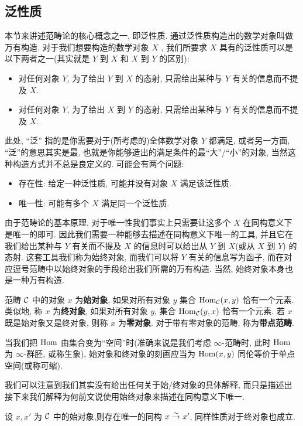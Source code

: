 \subsection{泛性质}
本节来讲述范畴论的核心概念之一, 即泛性质. 通过泛性质构造出的数学对象叫做万有构造. 对于我们想要构造的数学对象 $X$ , 我们所要求 $X$ 具有的泛性质可以是以下两者之一(其实就是 $Y$ 到 $X$ 和 $X$ 到 $Y$ 的区别):
\begin{itemize}
    \item 对任何对象 $Y$, 为了给出 $Y$ 到 $X$ 的态射, 只需给出某种与 $Y$ 有关的信息而不提及 $X$.
    \item 对任何对象 $Y$, 为了给出 $X$ 到 $Y$ 的态射, 只需给出某种与 $Y$ 有关的信息而不提及 $X$.
\end{itemize}
此处, ``泛'' 指的是你需要对于(所考虑的)全体数学对象 $Y$ 都满足, 或者另一方面, ``泛''的意思其实是最, 也就是你能够造出的满足条件的最``大''/``小''的对象, 当然这种构造方式并不总是良定义的. 可能会有两个问题:
\begin{itemize}
    \item 存在性: 给定一种泛性质, 可能并没有对象 $X$ 满足该泛性质.
    \item 唯一性: 可能有多个 $X$ 满足同一个泛性质.
\end{itemize}
由于范畴论的基本原理, 对于唯一性我们事实上只需要让这多个 $X$ 在同构意义下是唯一的即可. 因此我们需要一种能够去描述在同构意义下唯一的工具, 并且它在我们给出某种与 $Y$ 有关而不提及 $X$ 的信息时可以给出从 $Y$ 到 $X$(或从 $X$ 到 $Y$) 的态射.
这套工具我们称为始终对象, 而我们可以将 $Y$ 有关的信息写为函子, 而在对应逗号范畴中以始终对象的手段给出我们所需的万有构造. 当然, 始终对象本身也是一种万有构造.
\begin{definition}
    范畴 $\cal{C}$ 中的对象 $x$ 为\textbf{始对象}, 如果对所有对象 $y$ 集合 $\operatorname{Hom}_{\cal{C}}(x,y)$ 恰有一个元素. 类似地, 称 $x$ 为\textbf{终对象}, 如果对所有对象 $y$, 集合 $\operatorname{Hom}_{\cal{C}}(y,x)$ 恰有一个元素. 若 $x$ 既是始对象又是终对象, 则称 $x$ 为\textbf{零对象}. 对于带有零对象的范畴, 称为\textbf{带点范畴}.
\end{definition}
\begin{remark}
    当我们把 $\operatorname{Hom}$ 由集合变为``空间''时(准确来说是我们考虑 $\infty$-范畴时, 此时 $\operatorname{Hom}$ 为 $\infty$-群胚, 或称生象), 始对象和终对象的刻画应当为 $\operatorname{Hom}(x,y)$ 同伦等价于单点空间(或称可缩).
\end{remark}
我们可以注意到我们其实没有给出任何关于始/终对象的具体解释, 而只是描述出接下来我们解释为何前文说使用始终对象来描述在同构意义下唯一.
\begin{proposition}\label{命题:始对象存在则唯一}
    设 $x,x'$ 为 $\cal{C}$ 中的始对象,则存在唯一的同构 $x\stackrel{\sim}{\rightarrow} x'$, 同样性质对于终对象也成立.
\end{proposition}
